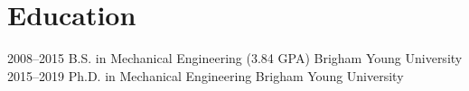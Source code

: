 \section{Education}

\begin{entrylist}
\entry
{2008--2015}
{B.S. {\normalfont in Mechanical Engineering (3.84 GPA)}}
{Brigham Young University}
{\vspace{-0.3cm}}
\entry
{2015--2019}
{Ph.D. {\normalfont in Mechanical Engineering}}
{Brigham Young University}

\end{entrylist}